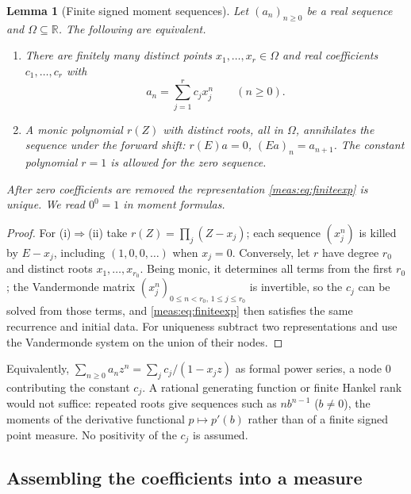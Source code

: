 \documentclass[11pt]{article}
\numberwithin{equation}{section}
\newtheorem{lemma}[theorem]{Lemma}
\theoremstyle{definition}
\theoremstyle{remark}
\newcommand{\R}{\mathbb R}
\begin{document}
\begin{lemma}[Finite signed moment sequences]\label{meas:lem:prony}
Let $(a_n)_{n\ge0}$ be a real sequence and $\Omega\subseteq\R$. The following are
equivalent.
\begin{enumerate}[label=(\roman*)]
\item There are finitely many distinct points $x_1,\ldots,x_r\in\Omega$ and real
coefficients $c_1,\ldots,c_r$ with
\begin{equation}\label{meas:eq:finiteexp}
 a_n=\sum_{j=1}^rc_jx_j^n\qquad(n\ge0).
\end{equation}
\item A monic polynomial $r(Z)$ with distinct roots, all in $\Omega$,
annihilates the sequence under the forward shift: $r(E)a=0$, $(Ea)_n=a_{n+1}$.
The constant polynomial $r=1$ is allowed for the zero sequence.
\end{enumerate}
After zero coefficients are removed the representation \eqref{meas:eq:finiteexp}
is unique. We read $0^0=1$ in moment formulas.
\end{lemma}
\begin{proof}
For (i)$\Rightarrow$(ii) take $r(Z)=\prod_j(Z-x_j)$; each sequence $(x_j^n)$ is
killed by $E-x_j$, including $(1,0,0,\ldots)$ when $x_j=0$. Conversely, let $r$
have degree $r_0$ and distinct roots $x_1,\ldots,x_{r_0}$. Being monic, it
determines all terms from the first $r_0$; the Vandermonde matrix
$(x_j^n)_{0\le n<r_0,\,1\le j\le r_0}$ is invertible, so the $c_j$ can be solved
from those terms, and \eqref{meas:eq:finiteexp} then satisfies the same
recurrence and initial data. For uniqueness subtract two representations and
use the Vandermonde system on the union of their nodes.
\end{proof}

Equivalently, $\sum_{n\ge0}a_nz^n=\sum_jc_j/(1-x_jz)$ as formal power series,
a node $0$ contributing the constant $c_j$. A rational generating function or
finite Hankel rank would not suffice: repeated roots give sequences such as
$nb^{n-1}$ ($b\ne0$), the moments of the derivative functional $p\mapsto p'(b)$
rather than of a finite signed point measure. No positivity of the $c_j$ is
assumed.

\subsection{Assembling the coefficients into a measure}
\end{document}
